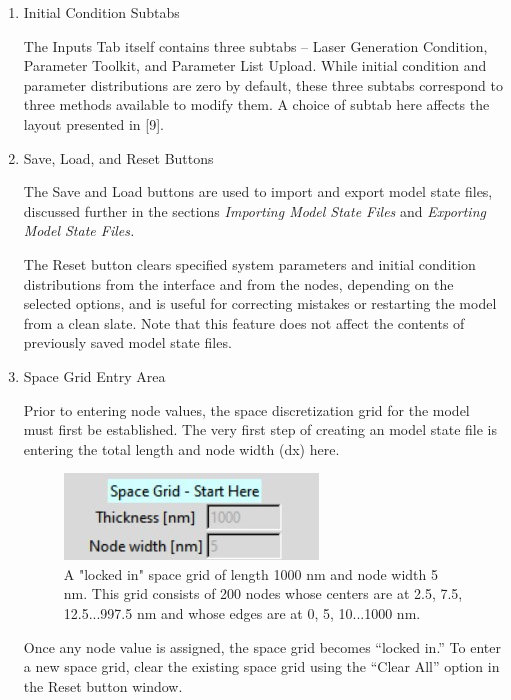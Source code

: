 \documentclass[11pt,letterpaper,titlepage]{article}
\begin{document}
			\begin{enumerate}
				\item Initial Condition Subtabs 
				\par The Inputs Tab itself contains three subtabs – Laser Generation Condition, Parameter Toolkit, and Parameter List Upload. While initial condition and parameter distributions are zero by default, these three subtabs correspond to three methods available to modify them. A choice of subtab here affects the layout presented in [9].
				
				\item Save, Load, and Reset Buttons
				\par The Save and Load buttons are used to import and export model state files, discussed further in the sections \textit{Importing Model State Files} and \textit{Exporting Model State Files.}
				\par The Reset button clears specified system parameters and initial condition distributions from the interface and from the nodes, depending on the selected options, and is useful for correcting mistakes or restarting the model from a clean slate. Note that this feature does not affect the contents of previously saved model state files.
				
				\item Space Grid Entry Area
				\par Prior to entering node values, the space discretization grid for the model must first be established. The very first step of creating an model state file is entering the total length and node width (dx) here.
				\begin{figure}[H]
					\label{fig:locked_in_spacegrid}
					\centering
					\includegraphics[scale=1]{"locked_in_spacegrid"}
					\caption{A "locked in" space grid of length 1000 nm and node width 5 nm. This grid consists of 200 nodes whose centers are at 2.5, 7.5, 12.5...997.5 nm and whose edges are at 0, 5, 10...1000 nm.}
				\end{figure}
				
				\par Once any node value is assigned, the space grid becomes “locked in.” To enter a new space grid, clear the existing space grid using the “Clear All” option in the Reset button window.
				

\end{enumerate}
\end{document}
